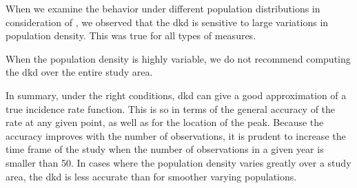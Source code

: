 When we examine the behavior under different population distributions in consideration of ,
we observed that the \gls{dkd} is sensitive to large variations in population density.
This was true for all types of measures.
\begin{rec}
    \label{rec:pop-density}
    When the population density is highly variable,
    we do not recommend computing the \gls{dkd} over the entire study area.
\end{rec}

In summary,
under the right conditions,
\gls{dkd} can give a good approximation of a true \gls{incidence rate} function.
This is so in terms of the general accuracy of the rate at any given point,
as well as for the location of the peak.
Because the accuracy improves with the number of observations,
it is prudent to increase the time frame of the study when the number of observations in a given year is smaller than 50.
In cases where the population density varies greatly over a study area,
the \gls{dkd} is less accurate than for smoother varying populations.

